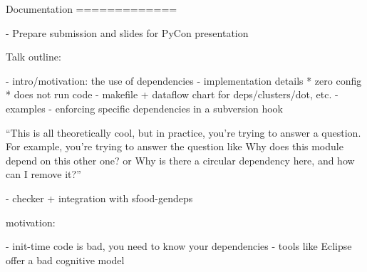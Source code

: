 

Documentation
=============

- Prepare submission and slides for PyCon presentation

  Talk outline:

  - intro/motivation: the use of dependencies
  - implementation details
    * zero config
    * does not run code
  - makefile + dataflow chart for deps/clusters/dot, etc.
  - examples
  - enforcing specific dependencies in a subversion hook

``This is all theoretically cool, but in practice, you're trying to
  answer a question.  For example, you're trying to answer the
  question like Why does this module depend on this other one? or Why
  is there a circular dependency here, and how can I remove it?''


- checker + integration with sfood-gendeps



motivation:

- init-time code is bad, you need to know your dependencies
- tools like Eclipse offer a bad cognitive model

